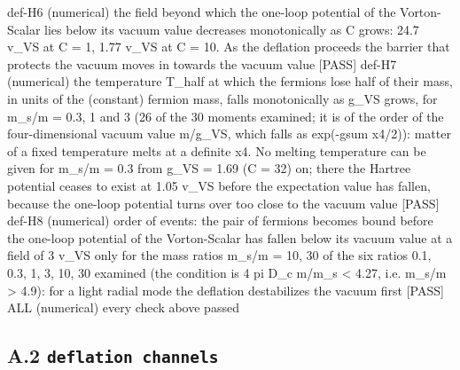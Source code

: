 \documentclass[
  10pt,
]{article}
\newenvironment{Shaded}{}{}
\newcommand{\NormalTok}[1]{#1}
\begin{document}
\begin{Shaded}
\begin{Highlighting}[]
\NormalTok{[PASS] def{-}H6  (numerical) the field beyond which the one{-}loop potential of the Vorton{-}Scalar lies below its vacuum value decreases monotonically as C grows: 24.7 v\_VS at C = 1, 1.77 v\_VS at C = 10. As the deflation proceeds the barrier that protects the vacuum moves in towards the vacuum value}
\NormalTok{[PASS] def{-}H7  (numerical) the temperature T\_half at which the fermions lose half of their mass, in units of the (constant) fermion mass, falls monotonically as g\_VS grows, for m\_s/m = 0.3, 1 and 3 (26 of the 30 moments examined; it is of the order of the four{-}dimensional vacuum value m/g\_VS, which falls as exp({-}gsum x4/2)): matter of a fixed temperature melts at a definite x4. No melting temperature can be given for m\_s/m = 0.3 from g\_VS = 1.69 (C = 32) on; there the Hartree potential ceases to exist at 1.05 v\_VS before the expectation value has fallen, because the one{-}loop potential turns over too close to the vacuum value}
\NormalTok{[PASS] def{-}H8  (numerical) order of events: the pair of fermions becomes bound before the one{-}loop potential of the Vorton{-}Scalar has fallen below its vacuum value at a field of 3 v\_VS only for the mass ratios m\_s/m = 10, 30 of the six ratios 0.1, 0.3, 1, 3, 10, 30 examined (the condition is 4 pi D\_c m/m\_s \textless{} 4.27, i.e. m\_s/m \textgreater{} 4.9): for a light radial mode the deflation destabilizes the vacuum first}
\NormalTok{[PASS] ALL  (numerical) every check above passed}
\end{Highlighting}
\end{Shaded}

\hypertarget{a.2-deflation-channels}{%
\subsection{\texorpdfstring{A.2
\texttt{deflation\ channels}}{A.2 deflation channels}}\label{a.2-deflation-channels}}
\end{document}
